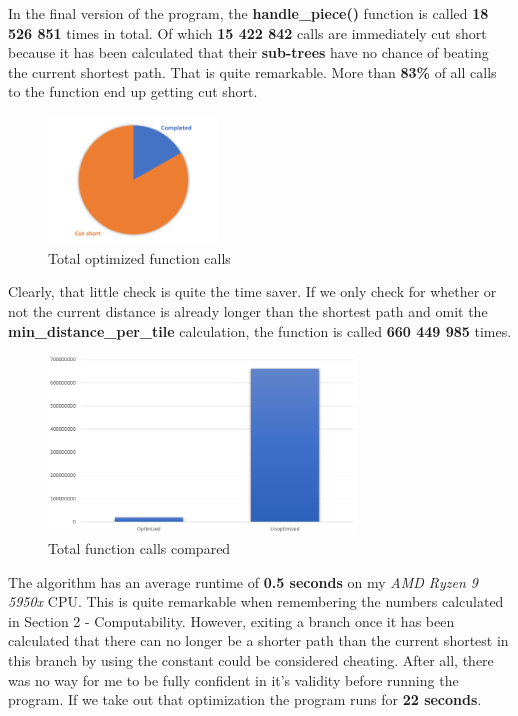 \documentclass[12pt]{article}
\begin{document}
In the final version of the program, the \textbf{handle\_piece()} function is called \linebreak \textbf{18 526 851} times in total. Of which \textbf{15 422 842} calls are immediately cut short because it has been calculated that their \textbf{sub-trees} have no chance of beating the current shortest path. That is quite remarkable. More than \textbf{83\%} of all calls to the function end up getting cut short. 

\begin{figure}[htbp]
    \centering
    \includegraphics[width=0.4\textwidth]{images/Figure14}
    \caption{Total optimized function calls}
    \label{fig:func-call-diagram-1}
\end{figure}

Clearly, that little check is quite the time saver. If we only check for whether or not the current distance is already longer than the shortest path and omit the \textbf{min\_distance\_per\_tile} calculation, the function is called \textbf{660 449 985} times.

\begin{figure}[htbp]
    \centering
    \includegraphics[width=0.73\textwidth]{images/Figure15}
    \caption{Total function calls compared}
    \label{fig:func-call-diagram-2}
\end{figure}

\newpage

The algorithm has an average runtime of \textbf{0.5 seconds} on my \textit{AMD Ryzen 9 5950x} CPU. This is quite remarkable when remembering the numbers calculated in Section 2 - Computability. However, exiting a branch once it has been calculated that there can no longer be a shorter path than the current shortest in this branch by using the   constant could be considered cheating. After all, there was no way for me to be fully confident in it's validity before running the program.
If we take out that optimization the program runs for \textbf{22 seconds}.
\end{document}
